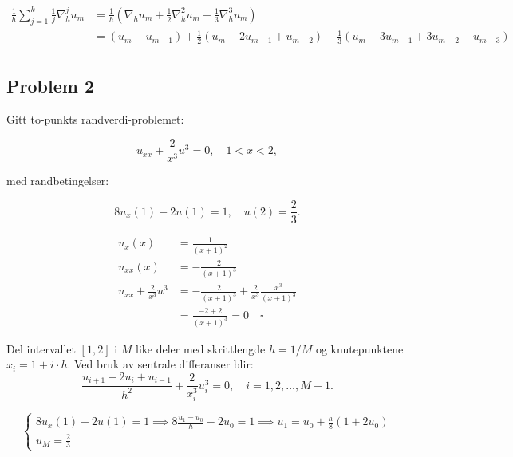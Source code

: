 
\begin{align*}
    \frac{1}{h} \sum_{j=1}^k \frac{1}{j} \nabla_h^j u_m &= \frac{1}{h} \left( \nabla_h u_m + \frac{1}{2} \nabla_h^2 u_m + \frac{1}{3} \nabla_h^3 u_m \right) \\
                                                        &= (u_m - u_{m-1}) + \frac{1}{2}(u_{m} - 2u_{m-1} + u_{m-2}) + \frac{1}{3}(u_{m} - 3u_{m-1} + 3u_{m-2} - u_{m-3}) \\
\end{align*}


\subsection*{Problem 2}

Gitt to-punkts randverdi-problemet:

\[
    u_{xx} + \frac{2}{x^3} u^3 = 0, \quad 1 < x < 2,
\]

med randbetingelser:

\[
    8u_x(1) - 2u(1) = 1, \quad u(2) = \frac{2}{3}.
\]



\begin{align*}
    u_x(x)                     & = \frac{1}{(x+1)^2}                                      \\
    u_{xx}(x)                  & = -\frac{2}{(x+1)^3}                                     \\
    u_{xx} + \frac{2}{x^3} u^3 & = -\frac{2}{(x+1)^3} + \frac{2}{x^3} \frac{x^3}{(x+1)^3} \\
                               & = \frac{-2 + 2}{(x+1)^3} = 0 \quad \square
\end{align*}


Del intervallet $[1, 2]$ i $M$ like deler med skrittlengde $h = 1/M$ og knutepunktene $x_i = 1 + i \cdot h$. Ved bruk av sentrale differanser blir:
\[
    \frac{u_{i+1} - 2u_i + u_{i-1}}{h^2} + \frac{2}{x_i^3} u_i^3 = 0, \quad i = 1, 2, \ldots, M-1.
\]

\[
    \begin{cases}
     8u_x(1) - 2u(1)  = 1 \implies 8\frac{u_1 - u_0}{h} - 2u_0 = 1 \implies u_1 = u_0 + \frac{h}{8}(1 + 2u_0) \\
        u_M = \frac{2}{3}
    \end{cases}
\]

